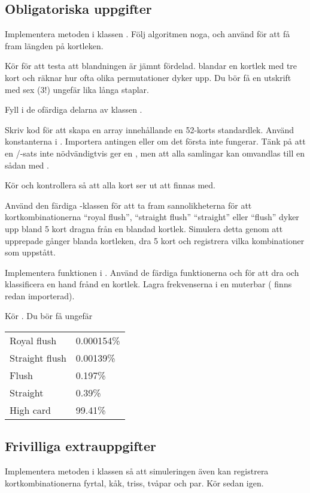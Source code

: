 \subsection{Obligatoriska uppgifter}

\Task 

\Subtask Implementera metoden  i klassen . Följ algoritmen noga, och använd  för att få fram längden på kortleken. 

\Subtask Kör  för att testa att blandningen är jämnt fördelad.  blandar en kortlek med tre kort och räknar hur ofta olika permutationer dyker upp. Du bör få en utskrift med sex ($3!$) ungefär lika långa staplar.

\Task Fyll i de ofärdiga delarna av klassen .

\Subtask Skriv kod för att skapa en array innehållande en 52-korts standardlek. Använd konstanterna i . Importera antingen  eller  om det första inte fungerar. Tänk på att en /-sats inte nödvändigtvis ger en , men att alla samlingar kan omvandlas till en sådan med .

\Subtask Kör  och kontrollera så att alla kort ser ut att finnas med.

\Task Använd den färdiga -klassen för att ta fram sannolikheterna för att kortkombinationerna ``royal flush'', ``straight flush'' ``straight'' eller ``flush'' dyker upp bland 5 kort dragna från en blandad kortlek. Simulera detta genom att upprepade gånger blanda kortleken, dra 5 kort och registrera vilka kombinationer som uppstått.

\Subtask Implementera funktionen  i . Använd de färdiga funktionerna  och  för att dra och klassificera en hand frånd en kortlek. Lagra frekvenserna i en muterbar  ( finns redan importerad).

\Subtask Kör . Du bör få ungefär \\
\begin{tabular}{ll}
Royal flush    & 0.000154\% \\
Straight flush & 0.00139\%  \\
Flush          & 0.197\%    \\
Straight       & 0.39\%     \\
High card      & 99.41\%
\end{tabular}


\subsection{Frivilliga extrauppgifter}

\Task Implementera metoden  i klassen  så att simuleringen även kan registrera kortkombinationerna fyrtal, kåk, triss, tvåpar och par. Kör sedan  igen.
